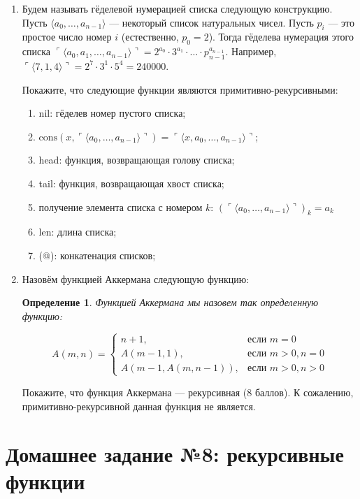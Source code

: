 \documentclass[10pt,a4paper,oneside]{article}
\newtheorem{definition}{Определение}
\begin{document}
\begin{enumerate}
\item Будем называть гёделевой нумерацией списка следующую конструкцию. Пусть $\langle a_0, \dots, a_{n-1} \rangle$ --- некоторый
список натуральных чисел. Пусть $p_i$ --- это простое число номер $i$ (естественно, $p_0 = 2$).
Тогда гёделева нумерация этого списка $\ulcorner \langle a_0, a_1, \dots, a_{n-1} \rangle \urcorner = 
2^{a_0} \cdot 3^{a_1} \cdot \dots \cdot p_{n-1}^{a_{n-1}}$.
Например, $\ulcorner \langle 7,1,4 \rangle\urcorner = 2^7 \cdot 3^1 \cdot 5^4 = 240000$.

Покажите, что следующие функции являются примитивно-рекурсивными:

\begin{enumerate}
\item nil: гёделев номер пустого списка;
\item $\textrm{cons}(x,\ulcorner\langle a_0,\dots,a_{n-1}\rangle\urcorner) = \ulcorner\langle x,a_0,\dots,a_{n-1}\rangle\urcorner$;
\item head: функция, возвращающая голову списка;
\item tail: функция, возвращающая хвост списка;
\item получение элемента списка с номером $k$: $(\ulcorner\langle a_0, \dots, a_{n-1} \rangle\urcorner)_k = a_k$
\item len: длина списка;
\item (@): конкатенация списков;
\end{enumerate}

\item Назовём функцией Аккермана следующую функцию:

\begin{definition}Функцией \emph{Аккермана} мы назовем так определенную 
функцию:

$$A(m,n) = \left\{\begin{array}{rl}
   n+1, & \mbox{если $m = 0$}\\
   A(m-1,1), & \mbox{если $m > 0, n = 0$}\\
   A(m-1,A(m,n-1)), & \mbox{если $m > 0, n > 0$}
\end{array}\right.$$
\end{definition}

Покажите, что функция Аккермана --- рекурсивная (8 баллов).
К сожалению, примитивно-рекурсивной данная функция не является.
\end{enumerate}

\section*{Домашнее задание №8: рекурсивные функции}
\end{document}
